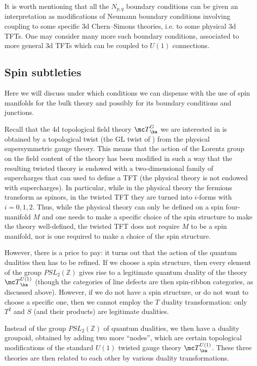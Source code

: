 \documentclass[11pt,reqno]{amsart}
\theoremstyle{plain}
\numberwithin{equation}{section}
\newcommand{\Z}{\mathbb{Z}}
\theoremstyle{definition}
\begin{document}
It is worth mentioning that all the $N_{p,q}$ boundary conditions can
be given an interpretation as modifications of Neumann boundary
conditions involving coupling to some specific 3d Chern--Simons
theories, i.e. to some physical 3d TFTs. One may consider many more
such boundary conditions, associated to more general 3d TFTs which can
be coupled to $U(1)$ connections.

\subsection{Spin subtleties}    \label{gerbes}
Here we will discuss under which conditions we can dispense 
with the use of spin manifolds for the bulk theory and possibly for 
its boundary conditions and junctions.

Recall that the 4d topological field theory ${\mc T}^G_\ka$ we are
interested in is obtained by a topological twist (the GL twist of
\cite{KW}) from the physical supersymmetric gauge theory. This means
that the action of the Lorentz group on the field content of the
theory has been modified in such a way that the resulting twisted
theory is endowed with a two-dimensional family of supercharges that
can used to define a TFT (the physical theory is not endowed with
supercharges). In particular, while in the physical theory the
fermions transform as spinors, in the twisted TFT they are turned into
$i$-forms with $i=0,1,2$. Thus, while the physical theory can only be
defined on a spin four-manifold $M$ and one needs to make a specific
choice of the spin structure to make the theory well-defined, the
twisted TFT does not require $M$ to be a spin manifold, nor is one
required to make a choice of the spin structure.

However, there is a price to pay: it turns out that the action of the
quantum dualities then has to be refined. If we choose a spin
structure, then every element of the group $PSL_2(\Z)$ gives rise to a
legitimate quantum duality of the theory ${\mc T}^{U(1)}_\ka$ (though
the categories of line defects are then spin-ribbon categories, as
discussed above). However, if we do not have a spin structure, or do
not want to choose a specific one, then we cannot employ the $T$
duality transformation: only $T^2$ and $S$ (and their products) are
legitimate dualities.

Instead of the group $PSL_2(\Z)$ of quantum dualities, we then have a
duality groupoid, obtained by adding two more ``nodes'', which are
certain topological modifications of the standard $U(1)$ twisted gauge
theory ${\mc T}^{U(1)}_\ka$. These three theories are then related to each
other by various duality transformations.
\end{document}
